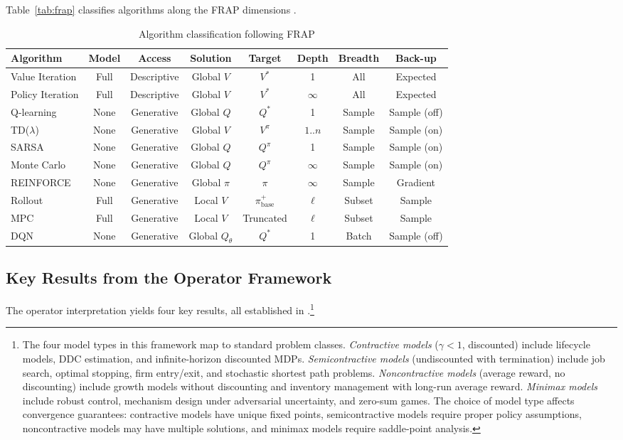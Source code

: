 Table~\ref{tab:frap} classifies algorithms along the FRAP dimensions \citep{moerland2022unifying}.

\begin{table}[h!]
\centering
\caption{Algorithm classification following FRAP \citep{moerland2022unifying}}
\label{tab:frap}
\label{tab:algorithm-classification}
\small
\begin{tabular}{l|cc|cc|cc|c}
\hline
Algorithm & Model & Access & Solution & Target & Depth & Breadth & Back-up \\
\hline
Value Iteration & Full & Descriptive & Global $V$ & $V^*$ & 1 & All & Expected \\
Policy Iteration & Full & Descriptive & Global $V$ & $V^*$ & $\infty$ & All & Expected \\
Q-learning & None & Generative & Global $Q$ & $Q^*$ & 1 & Sample & Sample (off) \\
TD($\lambda$) & None & Generative & Global $V$ & $V^\pi$ & $1..n$ & Sample & Sample (on) \\
SARSA & None & Generative & Global $Q$ & $Q^\pi$ & 1 & Sample & Sample (on) \\
Monte Carlo & None & Generative & Global $Q$ & $Q^\pi$ & $\infty$ & Sample & Sample (on) \\
REINFORCE & None & Generative & Global $\pi$ & $\pi$ & $\infty$ & Sample & Gradient \\
Rollout & Full & Generative & Local $V$ & $\pi_{\text{base}}^+$ & $\ell$ & Subset & Sample \\
MPC & Full & Generative & Local $V$ & Truncated & $\ell$ & Subset & Sample \\
DQN & None & Generative & Global $Q_\theta$ & $Q^*$ & 1 & Batch & Sample (off) \\
\hline
\end{tabular}
\end{table}

\subsection{Key Results from the Operator Framework}
\label{sec:why_matters}

The operator interpretation yields four key results, all established in \citet{bertsekas2024}.\footnote{The four model types in this framework map to standard problem classes. \emph{Contractive models} ($\gamma < 1$, discounted) include lifecycle models, DDC estimation, and infinite-horizon discounted MDPs. \emph{Semicontractive models} (undiscounted with termination) include job search, optimal stopping, firm entry/exit, and stochastic shortest path problems. \emph{Noncontractive models} (average reward, no discounting) include growth models without discounting and inventory management with long-run average reward. \emph{Minimax models} include robust control, mechanism design under adversarial uncertainty, and zero-sum games. The choice of model type affects convergence guarantees: contractive models have unique fixed points, semicontractive models require proper policy assumptions, noncontractive models may have multiple solutions, and minimax models require saddle-point analysis.}

